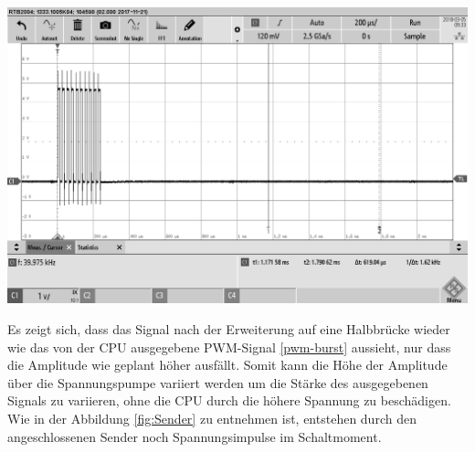 \begin{minipage}{0.5\textwidth}
\includegraphics[width=1\textwidth, draft]{Abbildungen/PWM-Nach-der-Halbbrucke-mit-LS.png}
\label{fig:Sender}
\end{minipage}
Es zeigt sich, dass das Signal nach der Erweiterung auf eine Halbbrücke wieder wie das von der CPU ausgegebene PWM-Signal \ref{pwm-burst} aussieht, nur dass die Amplitude wie geplant höher ausfällt. Somit kann die Höhe der Amplitude über die Spannungspumpe variiert werden um die Stärke des ausgegebenen Signals zu variieren, ohne die CPU durch die höhere Spannung zu beschädigen.
Wie in der Abbildung \ref{fig:Sender} zu entnehmen ist, entstehen durch den angeschlossenen Sender noch Spannungsimpulse im Schaltmoment.

